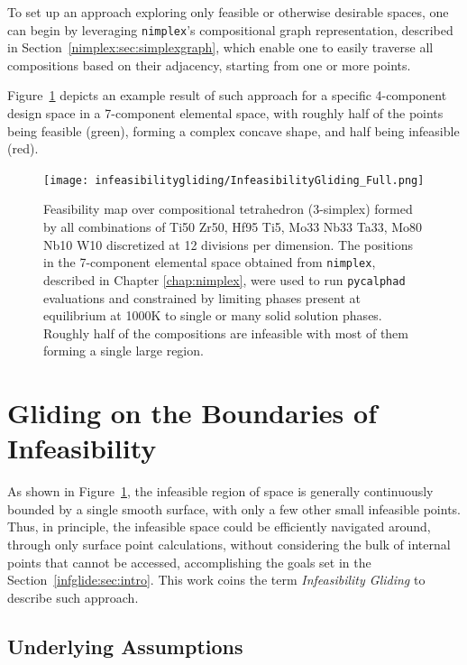 To set up an approach exploring only feasible or otherwise desirable spaces, one can begin by leveraging \texttt{nimplex}'s compositional graph representation, described in Section~\ref{nimplex:sec:simplexgraph}, which enable one to easily traverse all compositions based on their adjacency, starting from one or more points.

Figure~\ref{infeasibilitygliding:fig:fullcomputation} depicts an example result of such approach for a specific 4-component design space in a 7-component elemental space, with roughly half of the points being feasible (green), forming a complex concave shape, and half being infeasible (red).

\begin{figure}[H]
    \centering
    \texttt{[image: infeasibilitygliding/InfeasibilityGliding\_Full.png]}
    \caption{Feasibility map over compositional tetrahedron (3-simplex) formed by all combinations of Ti50 Zr50, Hf95 Ti5, Mo33 Nb33 Ta33, Mo80 Nb10 W10 discretized at 12 divisions per dimension. The positions in the 7-component elemental space obtained from \texttt{nimplex}, described in Chapter \ref{chap:nimplex}, were used to run \texttt{pycalphad} \cite{Otis2017Pycalphad:Python} evaluations and constrained by limiting phases present at equilibrium at 1000K to single or many solid solution phases. Roughly half of the compositions are infeasible with most of them forming a single large region.}
    \label{infeasibilitygliding:fig:fullcomputation}
\end{figure}

\section{Gliding on the Boundaries of Infeasibility} \label{infglide:sec:glide}

As shown in Figure~\ref{infeasibilitygliding:fig:fullcomputation}, the infeasible region of space is generally continuously bounded by a single smooth surface, with only a few other small infeasible points. Thus, in principle, the infeasible space could be efficiently navigated around, through only surface point calculations, without considering the bulk of internal points that cannot be accessed, accomplishing the goals set in the Section~\ref{infglide:sec:intro}. This work coins the term \emph{Infeasibility Gliding} to describe such approach.

\subsection{Underlying Assumptions} \label{infglide:ssec:assumptions}

